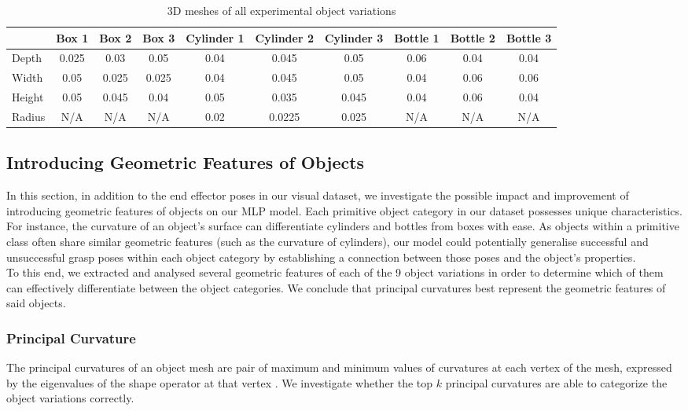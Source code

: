 \documentclass[11pt, a4paper]{report}
\begin{document}
\begin{table}[H]
{\begin{tabular}{lccccccccc}
            & Box 1 & Box 2 & Box 3 & Cylinder 1 & Cylinder 2 & Cylinder 3 & Bottle 1 & Bottle 2 & Bottle 3 \\
            \midrule
            Depth  & 0.025 & 0.03  & 0.05  & 0.04 & 0.045  & 0.05  & 0.06 & 0.04 & 0.04 \\
            Width  & 0.05  & 0.025 & 0.025 & 0.04 & 0.045  & 0.05  & 0.04 & 0.06 & 0.06 \\
            Height & 0.05  & 0.045 & 0.04  & 0.05 & 0.035  & 0.045 & 0.04 & 0.06 & 0.04 \\
            Radius & N/A   & N/A   & N/A   & 0.02 & 0.0225 & 0.025 & N/A  & N/A  & N/A  \\
            \bottomrule
        \end{tabular}
    }
    \caption{3D meshes of all experimental object variations}
    \label{tbl:5.1}
\end{table}


\subsection{Introducing Geometric Features of Objects}\label{sec:5.2.3}
In this section, in addition to the end effector poses in our visual dataset, we investigate the possible impact and improvement of introducing geometric features of objects on our MLP model. Each primitive object category in our dataset possesses unique characteristics. For instance, the curvature of an object's surface can differentiate cylinders and bottles from boxes with ease. As objects within a primitive class often share similar geometric features (such as the curvature of cylinders), our model could potentially generalise successful and unsuccessful grasp poses within each object category by establishing a connection between those poses and the object's properties.\\

To this end, we extracted and analysed several geometric features of each of the 9 object variations in order to determine which of them can effectively differentiate between the object categories. We conclude that principal curvatures best represent the geometric features of said objects.


\subsubsection{Principal Curvature}\label{sec:5.2.3.1}
The principal curvatures of an object mesh are pair of maximum and minimum values of curvatures at each vertex of the mesh, expressed by the eigenvalues of the shape operator at that vertex \cite{enwiki:1141654906}. We investigate whether the top $k$ principal curvatures are able to categorize the object variations correctly.
\end{document}
